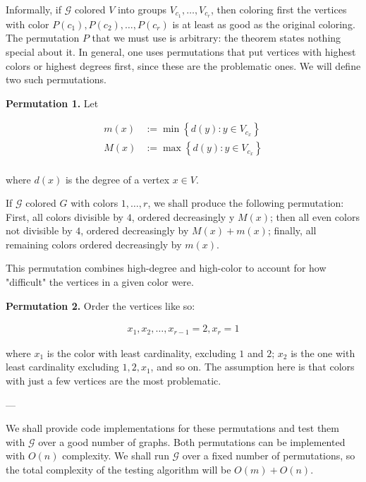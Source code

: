 \documentclass[a4paper, 12pt]{article}
\begin{document}
Informally, if $\mathcal{G}$ colored $V$ into groups $V_{c_1}, \ldots,
V_{c_r}$, then coloring first the vertices with color $P(c_1), P(c_2), \ldots,
P(c_r)$ is at least as good as the original coloring. The permutation $P$ that
we must use is arbitrary: the theorem states nothing special about it. In
general, one uses permutations that put vertices with highest colors or highest
degrees first, since these are the problematic ones. We will define two such
permutations.

\textbf{Permutation 1.} Let 

\begin{align*}
    m(x) &:= \min \left\{ d(y) : y \in V_{c_x} \right\} \\
    M(x) &:= \max \left\{ d(y) : y \in V_{c_x} \right\} \\
\end{align*}

where $d(x)$ is the degree of a vertex $x \in V$.

If $\mathcal{G}$ colored $G$ with colors $1, \ldots, r$, we shall produce the
following permutation: First, all colors divisible by $4$, ordered decreasingly
y $M(x)$; then all even colors not divisible by $4$, ordered decreasingly by
$M(x) + m(x)$; finally, all remaining colors ordered decreasingly by $m(x)$.

This permutation combines high-degree and high-color to account for how "difficult"
the vertices in a given color were.

\textbf{Permutation 2.} Order the vertices like so:

\begin{align*}
    x_1, x_2, \ldots, x_{r-1} = 2, x_{r} = 1
\end{align*}

where $x_1$ is the color with least cardinality, excluding $1$ and $2$; $x_2$
is the one with least cardinality excluding $1, 2, x_1$, and so on. The
assumption here is that colors with just a few vertices are the most
problematic.

--- 

We shall provide code implementations for these permutations and test them with
$\mathcal{G}$ over a good number of graphs. Both permutations can be
implemented with $O(n)$ complexity. We shall run $\mathcal{G}$ over a fixed
number of permutations, so the total complexity of the testing algorithm will
be $O(m) + O(n)$.
\end{document}
